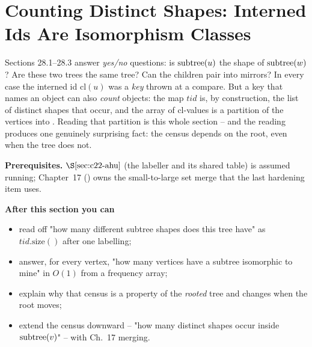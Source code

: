 \section{Counting Distinct Shapes: Interned Ids Are Isomorphism Classes}\label{sec:c22-distinct}

\begin{previouslybox}
Sections 28.1--28.3 answer \emph{yes/no} questions: is \(\operatorname{subtree}(u)\) the shape of
\(\operatorname{subtree}(w)\)?  Are these two trees the same tree?  Can the children pair into
mirrors?  In every case the interned id \(\mathrm{cl}(u)\) was a \emph{key} thrown
at a compare.  But a key that names an object can also \emph{count} objects: the
map \(\mathit{tid}\) is, by construction, the list of distinct shapes that occur,
and the array of \(\mathrm{cl}\)-values is a partition of the vertices into
.  Reading that partition is this whole section -- and
the reading produces one genuinely surprising fact: the census depends on the
root, even when the tree does not.
\end{previouslybox}

\begin{topicintro}
\textbf{Prerequisites.} \(\secref{c22-ahu}\) (the labeller and its shared table)
is assumed running; Chapter~17 () owns the small-to-large set merge
that the last hardening item uses.

\textbf{After this section you can}
\begin{itemize}[nosep]
  \item read off "how many different subtree shapes does this tree have" as \(\mathit{tid}.\mathrm{size()}\) after one labelling; \hfill{}
  \item answer, for every vertex, "how many vertices have a subtree isomorphic to mine" in \(O(1)\) from a frequency array; \hfill{}
  \item explain why that census is a property of the \emph{rooted} tree and changes when the root moves; \hfill{}
  \item extend the census downward -- "how many distinct shapes occur inside \(\operatorname{subtree}(v)\)" -- with Ch.~17 merging. \hfill{}
\end{itemize}
\end{topicintro}

